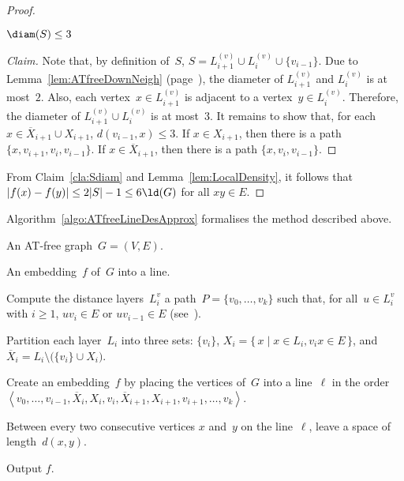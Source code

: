 \begin{proof}
\begin{claim}
    \label{cla:Sdiam}
\( \diam(S) \leq 3 \)
\end{claim}

\begin{proof}
    [Claim]
Note that, by definition of~$S$, $S = L_{i+1}^{(v)} \cup L_i^{(v)} \cup \{ v_{i-1} \}$.
Due to Lemma~\ref{lem:ATfreeDownNeigh} (page~\pageref{lem:ATfreeDownNeigh}), the diameter of $L_{i+1}^{(v)}$ and $L_i^{(v)}$ is at most~$2$.
Also, each vertex~$x \in L_{i+1}^{(v)}$ is adjacent to a vertex~$y \in L_i^{(v)}$.
Therefore, the diameter of $L_{i+1}^{(v)} \cup L_i^{(v)}$ is at most~$3$.
It remains to show that, for each $x \in \overline{X}_{i + 1} \cup X_{i + 1}$, $d(v_{i-1}, x) \leq 3$.
If $x \in X_{i + 1}$, then there is a path $\{ x, v_{i+1}, v_i, v_{i-1} \}$.
If $x \in \overline{X}_{i + 1}$, then there is a path $\{ x, v_i, v_{i-1} \}$.
\end{proof}

From Claim~\ref{cla:Sdiam} and Lemma~\ref{lem:LocalDensity}, it follows that $|f(x) - f(y)| \leq 2 |S| - 1 \leq 6 \ld(G)$ for all $xy \in E$.
\end{proof}

Algorithm~\ref{algo:ATfreeLineDesApprox} formalises the method described above.

\begin{algorithm}
    [htb]
    \caption
    {%
        \label{algo:ATfreeLineDesApprox}
        A $6$-approximation algorithm for the minimum line-distortion of an AT-free graph.
    }

\KwIn
{%
    An AT-free graph~$G = (V, E)$.
}

\KwOut
{%
    An embedding~$f$ of~$G$ into a line.
}

Compute the distance layers~$L_i^{v}$ a path~$P = \{ v_0, \ldots, v_k \}$ such that, for all~$u \in L_i^{v}$ with $i \geq 1$, $uv_i \in E$ or $uv_{i-1} \in E$ (see~\cite{KlokKratMuel1999}).

Partition each layer~$L_i$ into three sets: $\{ v_i \}$, $X_i = \{ \, x \mid x \in L_i, v_ix \in E \, \}$, and $\overline{X}_i = L_i \setminus \big( \{ v_i \} \cup X_i \big)$.

Create an embedding~$f$ by placing the vertices of~$G$ into a line~$\ell$ in the order~$\left \langle v_0, \ldots, v_{i-1}, \overline{X}_{i}, X_{i}, v_i, \overline{X}_{i + 1}, X_{i + 1}, v_{i + 1}, \ldots, v_k \right \rangle$.

Between every two consecutive vertices $x$ and~$y$ on the line~$\ell$, leave a space of length~$d(x, y)$.

Output $f$.
\end{algorithm}

